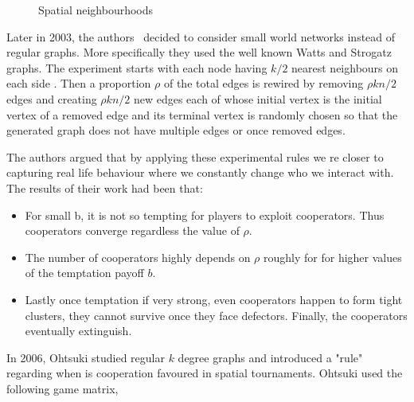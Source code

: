 \documentclass{article}
\theoremstyle{definition}
\begin{document}
\begin{figure}[!hbtp]
\centering
    \begin{subfigure}{.25\textwidth}
        
    \end{subfigure}
    \begin{subfigure}{.25\textwidth}\centering
        
     \end{subfigure}
     \begin{subfigure}{.25\textwidth}\centering
        
     \end{subfigure}
     \caption{Spatial neighbourhoods}\label{fig:topologies}
    \end{figure}


Later in 2003, the authors~\cite{MASUDA2003} decided to consider small world
networks instead of regular graphs. More specifically they used the well
known Watts and Strogatz~\cite{watts1998} graphs. The experiment starts with each node
having \(k/2\) nearest neighbours on each side
. Then a proportion \(\rho\) of
the total edges is rewired by removing \(\rho kn/2\) edges and creating
\(\rho kn/2\) new edges each of whose initial vertex is the initial vertex of a removed
edge and its terminal vertex is randomly chosen so that the generated graph does
not have multiple edges or once removed edges.

The authors argued that by applying these experimental rules we re closer to
capturing real life behaviour where we constantly change who we interact with.
The results of their work had been that:

\begin{itemize}
    \item For small b, it is not so tempting for players to exploit cooperators.
    Thus cooperators converge regardless the value of \(\rho\).
    \item The number of cooperators highly depends on \(\rho\) roughly for for higher
    values of the temptation payoff \(b\).
    \item Lastly once temptation if very strong, even cooperators happen to form
    tight clusters, they cannot survive once they face defectors. Finally, the 
    cooperators eventually extinguish.
\end{itemize}

In 2006, Ohtsuki studied regular \(k\) degree graphs and introduced a "rule"
regarding when is cooperation favoured in spatial tournaments.
Ohtsuki used the following game matrix,
\end{document}
